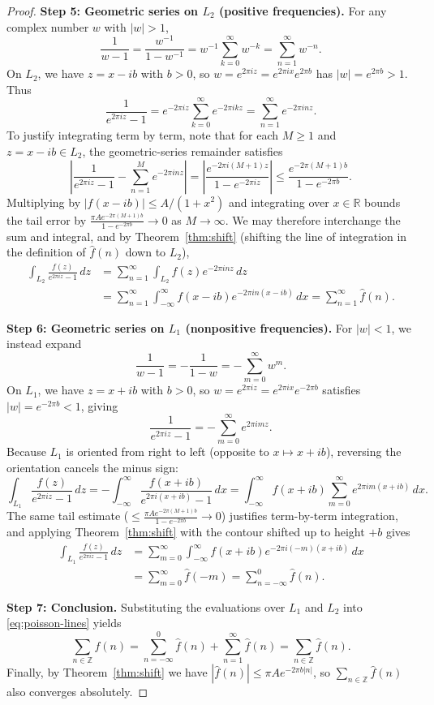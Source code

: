 \documentclass[11pt]{article}
\theoremstyle{plain}
\theoremstyle{definition}
\theoremstyle{boldremark}
\theoremstyle{remark}
\numberwithin{equation}{section}
\newcommand{\R}{\mathbb{R}}
\newcommand{\Z}{\mathbb{Z}}
\begin{document}
\begin{proof}
\textbf{Step 5: Geometric series on $L_2$ (positive frequencies).}
For any complex number $w$ with $|w|>1$,
\[
 \frac{1}{w-1}
 = \frac{w^{-1}}{1-w^{-1}}
 = w^{-1}\sum_{k=0}^{\infty} w^{-k}
 = \sum_{n=1}^{\infty} w^{-n}.
\]
On $L_2$, we have $z=x-ib$ with $b>0$, so
$w=e^{2\pi i z}=e^{2\pi i x}e^{2\pi b}$ has $|w|=e^{2\pi b}>1$. Thus
\[
 \frac{1}{e^{2\pi i z}-1}
 = e^{-2\pi i z}\sum_{k=0}^{\infty} e^{-2\pi i k z}
 = \sum_{n=1}^{\infty} e^{-2\pi i n z}.
\]
To justify integrating term by term, note that for each $M\geq 1$ and
$z=x-ib\in L_2$, the geometric-series remainder satisfies
\[
 \left|\frac{1}{e^{2\pi i z}-1}-\sum_{n=1}^{M} e^{-2\pi i n z}\right|
 = \left|\frac{e^{-2\pi i(M+1)z}}{1-e^{-2\pi i z}}\right|
 \leq \frac{e^{-2\pi(M+1)b}}{1-e^{-2\pi b}}.
\]
Multiplying by $|f(x-ib)|\leq A/(1+x^2)$ and integrating over $x\in\R$
bounds the tail error by $\frac{\pi A e^{-2\pi(M+1)b}}{1-e^{-2\pi b}}\to 0$
as $M\to\infty$. We may therefore interchange the sum and integral, and by
Theorem~\ref{thm:shift} (shifting the line of integration in the definition
of $\widehat f(n)$ down to $L_2$),
\begin{align*}
 \int_{L_2}\frac{f(z)}{e^{2\pi i z}-1}\,dz
 &= \sum_{n=1}^{\infty}\int_{L_2} f(z)e^{-2\pi i n z}\,dz \\
 &= \sum_{n=1}^{\infty}\int_{-\infty}^{\infty}
    f(x-ib)e^{-2\pi i n(x-ib)}\,dx
  = \sum_{n=1}^{\infty}\widehat f(n).
\end{align*}

\textbf{Step 6: Geometric series on $L_1$ (nonpositive frequencies).}
For $|w|<1$, we instead expand
\[
 \frac{1}{w-1} = -\frac{1}{1-w} = -\sum_{m=0}^{\infty} w^m.
\]
On $L_1$, we have $z=x+ib$ with $b>0$, so
$w=e^{2\pi i z}=e^{2\pi i x}e^{-2\pi b}$ satisfies $|w|=e^{-2\pi b}<1$,
giving
\[
 \frac{1}{e^{2\pi i z}-1} = -\sum_{m=0}^{\infty} e^{2\pi i m z}.
\]
Because $L_1$ is oriented from right to left (opposite to $x\mapsto x+ib$),
reversing the orientation cancels the minus sign:
\[
 \int_{L_1}\frac{f(z)}{e^{2\pi i z}-1}\,dz
 = -\int_{-\infty}^{\infty}\frac{f(x+ib)}{e^{2\pi i(x+ib)}-1}\,dx
 = \int_{-\infty}^{\infty} f(x+ib)
    \sum_{m=0}^{\infty} e^{2\pi i m(x+ib)}\,dx.
\]
The same tail estimate ($\leq \frac{\pi A e^{-2\pi(M+1)b}}{1-e^{-2\pi b}}\to 0$)
justifies term-by-term integration, and applying Theorem~\ref{thm:shift}
with the contour shifted up to height $+b$ gives
\begin{align*}
 \int_{L_1}\frac{f(z)}{e^{2\pi i z}-1}\,dz
 &= \sum_{m=0}^{\infty}\int_{-\infty}^{\infty}
    f(x+ib)e^{-2\pi i(-m)(x+ib)}\,dx \\
 &= \sum_{m=0}^{\infty}\widehat f(-m)
  = \sum_{n=-\infty}^{0}\widehat f(n).
\end{align*}

\textbf{Step 7: Conclusion.}
Substituting the evaluations over $L_1$ and $L_2$ into
\eqref{eq:poisson-lines} yields
\[
 \sum_{n\in\Z} f(n)
 = \sum_{n=-\infty}^{0}\widehat f(n) + \sum_{n=1}^{\infty}\widehat f(n)
 = \sum_{n\in\Z}\widehat f(n).
\]
Finally, by Theorem~\ref{thm:shift} we have
$|\widehat f(n)|\leq \pi A e^{-2\pi b|n|}$, so $\sum_{n\in\Z}\widehat f(n)$
also converges absolutely.
\end{proof}

\end{document}
